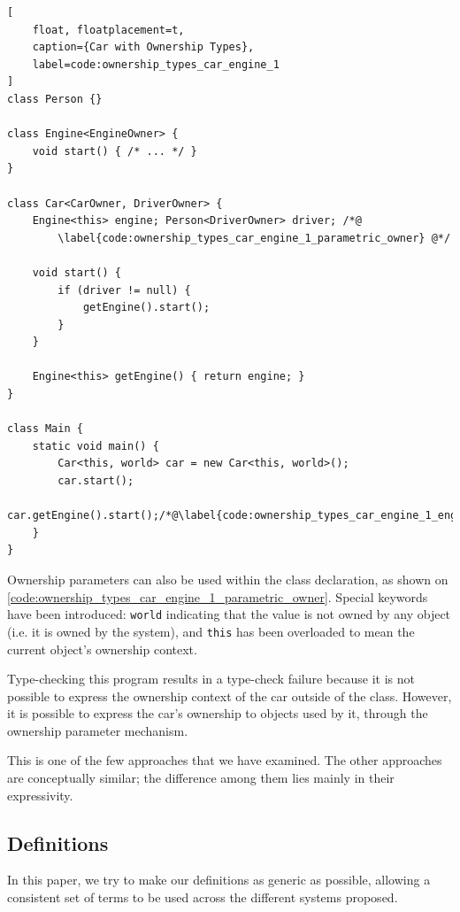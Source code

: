 \documentclass{acm_proc_article-sp}
\begin{document}
\begin{lstlisting}[
	float, floatplacement=t,
	caption={Car with Ownership Types},
	label=code:ownership_types_car_engine_1
]
class Person {}

class Engine<EngineOwner> {
	void start() { /* ... */ }
}

class Car<CarOwner, DriverOwner> {
	Engine<this> engine; Person<DriverOwner> driver; /*@
		\label{code:ownership_types_car_engine_1_parametric_owner} @*/
	
	void start() {
		if (driver != null) {
			getEngine().start();
		}
	}

	Engine<this> getEngine() { return engine; }
}

class Main {
	static void main() {
		Car<this, world> car = new Car<this, world>();
		car.start();
		car.getEngine().start();/*@\label{code:ownership_types_car_engine_1_engine_start}@*/
	}
}
\end{lstlisting}

Ownership parameters can also be used within the class declaration, as shown on 
\cref{code:ownership_types_car_engine_1_parametric_owner}. Special keywords 
have been introduced: \lstinline|world| indicating that the value is not owned 
by any object (i.e. it is owned by the system), and \lstinline|this| has been 
overloaded to mean the current object's ownership context.

Type-checking this program results in a type-check failure because it is not 
possible to express the ownership context of the car outside of the class. 
However, it is possible to express the car's ownership to objects used by it, 
through the ownership parameter mechanism.

This is one of the few approaches that we have examined. The other approaches 
are conceptually similar; the difference among them lies mainly in their 
expressivity.

\subsection{Definitions}
\label{subsec:definitions}

In this paper, we try to make our definitions as generic as possible, allowing 
a consistent set of terms to be used across the different systems proposed.
\end{document}
